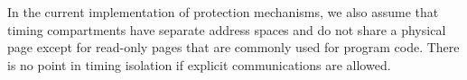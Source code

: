 In the current implementation of protection mechanisms, we also assume that
timing compartments have separate address spaces and do not share a physical
page except for read-only pages that are commonly used for program code.
There is no point in timing isolation if explicit communications are allowed.







